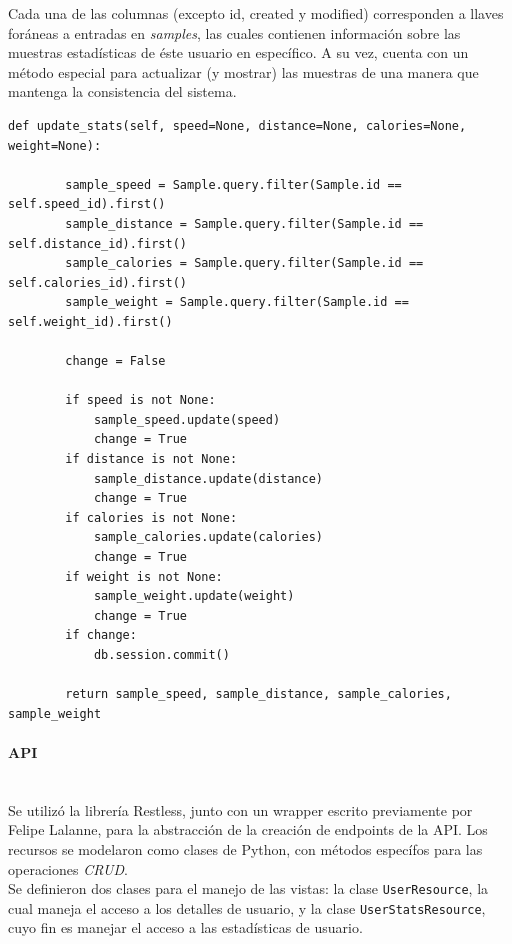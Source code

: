 \documentclass[11pt,letterpaper]{article}
\begin{document}
Cada una de las columnas (excepto id, created y modified) corresponden a llaves foráneas a entradas en \emph{samples}, las cuales contienen información sobre las muestras estadísticas de éste usuario en específico. A su vez, cuenta con un método especial para actualizar (y mostrar) las muestras de una manera que mantenga la consistencia del sistema.
\pagebreak
\begin{lstlisting}[title=Rutina de actualización de muestras estadísticas.]
    def update_stats(self, speed=None, distance=None, calories=None, weight=None):

        sample_speed = Sample.query.filter(Sample.id == self.speed_id).first()
        sample_distance = Sample.query.filter(Sample.id == self.distance_id).first()
        sample_calories = Sample.query.filter(Sample.id == self.calories_id).first()
        sample_weight = Sample.query.filter(Sample.id == self.weight_id).first()

        change = False

        if speed is not None:
            sample_speed.update(speed)
            change = True
        if distance is not None:
            sample_distance.update(distance)
            change = True
        if calories is not None:
            sample_calories.update(calories)
            change = True
        if weight is not None:
            sample_weight.update(weight)
            change = True
        if change:
            db.session.commit()

        return sample_speed, sample_distance, sample_calories, sample_weight
\end{lstlisting}

\paragraph{API\\\\}

Se utilizó la librería Restless, junto con un wrapper escrito previamente por Felipe Lalanne, para la abstracción de la creación de endpoints de la API. Los recursos se modelaron como clases de Python, con métodos específos para las operaciones \emph{CRUD}.\\

Se definieron dos clases para el manejo de las vistas: la clase \texttt{UserResource}, la cual maneja el acceso a los detalles de usuario, y la clase \texttt{UserStatsResource}, cuyo fin es manejar el acceso a las estadísticas de usuario.
\end{document}
